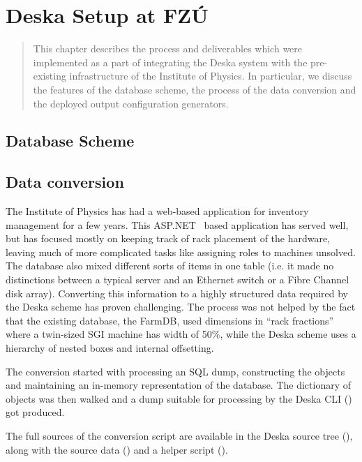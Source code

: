 \documentclass[deska]{subfiles}
\begin{document}
\chapter{Deska Setup at FZÚ}
\label{sec:fzu-setup}

\begin{abstract}
This chapter describes the process and deliverables which were implemented as a part of integrating the Deska system
with the pre-existing infrastructure of the Institute of Physics.  In particular, we discuss the features of the
database scheme, the process of the data conversion and the deployed output configuration generators.
\end{abstract}

\section{Database Scheme}
\label{sec:fzu-scheme}

\section{Data conversion}
\label{sec:fzu-farmdb}

The Institute of Physics has had a web-based application for inventory management for a few years.  This
ASP.NET~\cite{asp.net} based application has served well, but has focused mostly on keeping track of rack placement of
the hardware, leaving much of more complicated tasks like assigning roles to machines unsolved.  The database also mixed
different sorts of items in one table (i.e. it made no distinctions between a typical server and an Ethernet switch or a
Fibre Channel disk array).  Converting this information to a highly structured data required by the Deska scheme has
proven challenging.  The process was not helped by the fact that the existing database, the FarmDB, used dimensions in
``rack fractions'' where a twin-sized SGI machine has width of 50\%, while the Deska scheme uses a hierarchy of nested
boxes and internal offsetting.

The conversion started with processing an SQL dump, constructing the objects and maintaining an in-memory representation
of the database.  The dictionary of objects was then walked and a dump suitable for processing by the Deska CLI
() got produced.

The full sources of the conversion script are available in the Deska source tree (), along
with the source data () and a helper script ().
\end{document}
